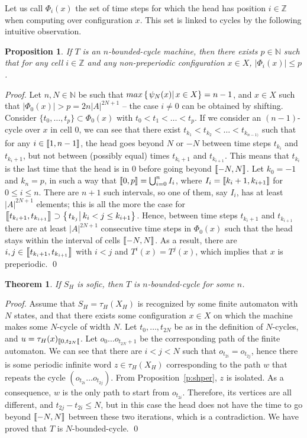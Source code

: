 \documentclass{llncs}
\newtheorem{teo}{Theorem}
\newtheorem{prop}{Proposition}
\newcommand{\Zset}{{\mathbb Z}}
\newcommand{\Nset}{{\mathbb N}}
\newcommand{\card}[1]{\left|#1\right|}
\newcommand{\sett}[2]{\left\{\left.#1\vphantom{#2}\right|#2\right\}}
\begin{document}
Let us call $\Phi_i(x)$ the set of time steps for which the head has position $i\in\Zset$ when computing over configuration $x$.
This set is linked to cycles by the following intuitive observation.
\begin{prop}\label{p:zzbound}
If $T$ is an $n$-bounded-cycle machine, then there exists $p\in\Nset$ such that for any cell $i\in\Zset$ and any non-preperiodic configuration $x\in X$, $\card{\Phi_i(x)}\le p$.
\end{prop}
\begin{proof}
Let $n,N\in\Nset$ be such that $max\sett{\psi_N(x)}{x\in X}=n-1$, and $x\in X$ such that $\card{\Phi_0(x)}>p=2n\card A^{2N+1}$ -- the case $i\ne0$ can be obtained by shifting.
Consider $\{t_0,\ldots,t_p\}\subset\Phi_0(x)$ with $t_0<t_1<\ldots<t_p$.
If we consider an $(n-1)$-cycle over $x$ in cell $0$, we can see that there exist $t_{k_1}<t_{k_2}<\ldots<t_{k_{n-1)}}$ such that for any $i\in\left\llbracket 1,n-1\right\rrbracket$, the head goes beyond $N$ or $-N$ between time steps $t_{k_i}$ and $t_{k_i+1}$, but not between (possibly equal) times $t_{k_i+1}$ and $t_{k_{i+1}}$.
This means that $t_{k_i}$ is the last time that the head is in $0$ before going beyond $\left\llbracket -N,N\right\rrbracket$.
Let $k_0=-1$ and $k_{n}=p$, in such a way that $\left\llbracket 0,p\right\rrbracket=\bigcup_{i=0}^{n}I_i$, where $I_i=\left\llbracket k_i+1,k_{i+1}\right\rrbracket$ for $0\le i\le n$. 
There are $n+1$ such intervals, so one of them, say $I_i$, has at least $\card A^{2N+1}$ elements; this is all the more the case for $\cc{t_{k_i+1}}{t_{k_{i+1}}}\supset\sett{t_{k_j}}{k_i<j\le k_{i+1}}$.
Hence, between time steps $t_{k_i+1}$ and $t_{k_{i+1}}$ there are at least $\card A^{2N+1}$ consecutive time steps in $\Phi_0(x)$ such that the head stays within the interval of cells $\left\llbracket -N,N\right\rrbracket$.
As a result, there are $i,j\in\left\llbracket t_{k_i+1},t_{k_{i+1}}\right\rrbracket$ with $i<j$ and $T^i(x)=T^j(x)$, which implies that $x$ is preperiodic.
\qed\end{proof}
\begin{teo}
If $S_H$ is sofic, then $T$ is $n$-bounded-cycle for some $n$.
\end{teo}
\begin{proof}
Assume that $S_H=\tau_H(X_H)$ is recognized by some finite automaton with $N$ states, and that there exists some configuration $x\in X$ on which the machine makes some $N$-cycle of width $N$.
Let $t_0,\ldots,t_{2N}$ be as in the definition of $N$-cycles, and $u=\tau_H(x)_{\left\llbracket 0,t_{2N}\right\llbracket}$.
Let $o_0\ldots o_{t_{2N}+1}$ be the corresponding path of the finite automaton.
We can see that there are $i<j<N$ such that $o_{t_{2i}}=o_{t_{2j}}$, hence there is some periodic infinite word $z\in\tau_H(X_H)$ corresponding to the path $w$ that repeats the cycle $(o_{t_{2i}}\ldots o_{t_{2j}})$.
From Proposition~\ref{p:shper}, $z$ is isolated.
As a consequence, $w$ is the only path to start from $o_{t_{2i}}$.
Therefore, its vertices are all different, and $t_{2j}-t_{2i}\le N$, but in this case the head does not have the time to go beyond $\left\llbracket -N,N\right\rrbracket$ between these two iterations, which is a contradiction.
We have proved that $T$ is $N$-bounded-cycle.
\qed
\end{proof}
\end{document}
